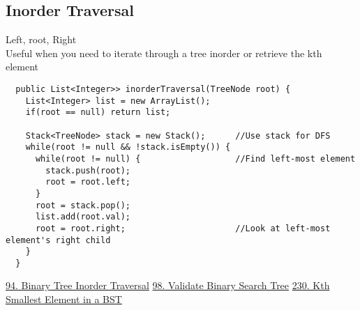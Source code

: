 \documentclass{article}
\begin{document}
  \subsection{Inorder Traversal}
  Left, root, Right \\
  Useful when you need to iterate through a tree inorder or retrieve the kth element
  \begin{lstlisting}
  public List<Integer>> inorderTraversal(TreeNode root) {
    List<Integer> list = new ArrayList();
    if(root == null) return list;
    
    Stack<TreeNode> stack = new Stack();      //Use stack for DFS
    while(root != null && !stack.isEmpty()) {
      while(root != null) {                   //Find left-most element
        stack.push(root);
        root = root.left;
      }
      root = stack.pop();
      list.add(root.val);
      root = root.right;                      //Look at left-most element's right child
    }
  }
  \end{lstlisting}
  \href{https://leetcode.com/problems/binary-tree-inorder-traversal/description/}{94. Binary Tree Inorder Traversal} \quad \href{https://leetcode.com/problems/validate-binary-search-tree/}{98. Validate Binary Search Tree} \quad \href{https://leetcode.com/problems/kth-smallest-element-in-a-bst/solution/}{230. Kth Smallest Element in a BST}
\end{document}
